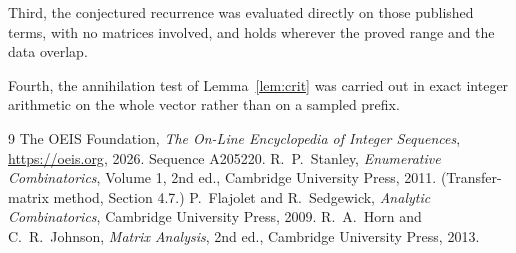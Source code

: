 \documentclass[11pt,a4paper]{article}
\theoremstyle{plain}
\theoremstyle{definition}
\begin{document}
Third, the conjectured recurrence was evaluated directly on those published terms, with no
matrices involved, and holds wherever the proved range and the data overlap.

Fourth, the annihilation test of Lemma~\ref{lem:crit} was carried out in exact integer
arithmetic on the whole vector rather than on a sampled prefix.

\begin{thebibliography}{9}
 The OEIS Foundation, \emph{The On-Line Encyclopedia of Integer
Sequences}, \url{https://oeis.org}, 2026. Sequence A205220.
 R.~P.~Stanley, \emph{Enumerative Combinatorics}, Volume 1, 2nd ed.,
Cambridge University Press, 2011. (Transfer-matrix method, Section 4.7.)
 P.~Flajolet and R.~Sedgewick, \emph{Analytic Combinatorics}, Cambridge
University Press, 2009.
 R.~A.~Horn and C.~R.~Johnson, \emph{Matrix Analysis}, 2nd ed., Cambridge
University Press, 2013.
\end{thebibliography}
\end{document}
